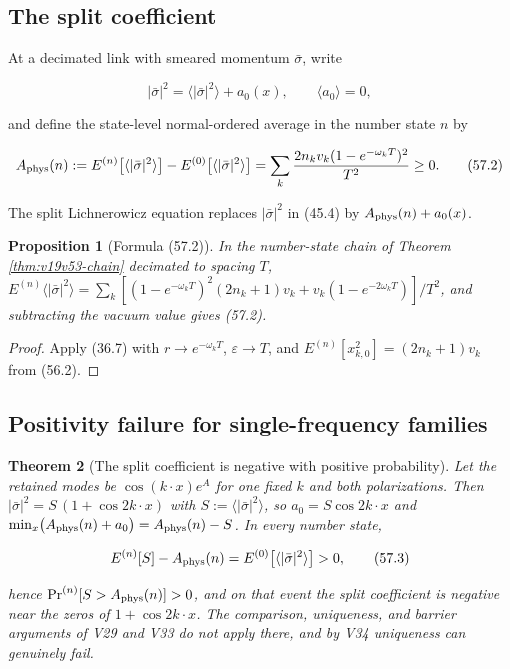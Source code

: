 \documentclass[11pt]{article}
\newtheorem{theorem}{Theorem}[section]
\newtheorem{proposition}[theorem]{Proposition}
\theoremstyle{remark}
\begin{document}
\subsection{The split coefficient}

At a decimated link with smeared momentum \(\bar\sigma\), write

\[
 |\bar\sigma|^2=\langle|\bar\sigma|^2\rangle+a_0(x),\qquad
 \langle a_0\rangle=0,                                                 \tag{57.1}
\]

and define the state-level normal-ordered average in the number state
\(n\) by

\[
 A_{\rm phys}(n):=E^{(n)}\bigl[\langle|\bar\sigma|^2\rangle\bigr]
 -E^{(0)}\bigl[\langle|\bar\sigma|^2\rangle\bigr]
 =\sum_k\frac{2n_kv_k(1-e^{-\omega_kT})^2}{T^2}\geq0.                  \tag{57.2}
\]

The split Lichnerowicz equation replaces \(|\bar\sigma|^2\) in (45.4) by
\(A_{\rm phys}(n)+a_0(x)\).

\begin{proposition}[Formula (57.2)]
\label{prop:v19v54-aphys}
In the number-state chain of Theorem \ref{thm:v19v53-chain} decimated
to spacing \(T\), \(E^{(n)}\langle|\bar\sigma|^2\rangle
=\sum_k[(1-e^{-\omega_kT})^2(2n_k+1)v_k+v_k(1-e^{-2\omega_kT})]/T^2\),
and subtracting the vacuum value gives (57.2).
\end{proposition}

\begin{proof}
Apply (36.7) with \(r\to e^{-\omega_kT}\), \(\varepsilon\to T\), and
\(E^{(n)}[x_{k,0}^2]=(2n_k+1)v_k\) from (56.2).
\end{proof}

\subsection{Positivity failure for single-frequency families}

\begin{theorem}[The split coefficient is negative with positive probability]
\label{thm:v19v54-failure}
Let the retained modes be \(\cos(k\cdot x)e^A\) for one fixed \(k\) and
both polarizations.  Then \(|\bar\sigma|^2=S\,(1+\cos2k\cdot x)\) with
\(S:=\langle|\bar\sigma|^2\rangle\), so \(a_0=S\cos2k\cdot x\) and
\(\min_x\bigl(A_{\rm phys}(n)+a_0\bigr)=A_{\rm phys}(n)-S\).  In every
number state,

\[
 E^{(n)}[S]-A_{\rm phys}(n)=E^{(0)}\bigl[\langle|\bar\sigma|^2\rangle\bigr]>0,
                                                                    \tag{57.3}
\]

hence \(\Pr^{(n)}[S>A_{\rm phys}(n)]>0\), and on that event the split
coefficient is negative near the zeros of \(1+\cos2k\cdot x\).  The
comparison, uniqueness, and barrier arguments of V29 and V33 do not
apply there, and by V34 uniqueness can genuinely fail.
\end{theorem}
\end{document}
